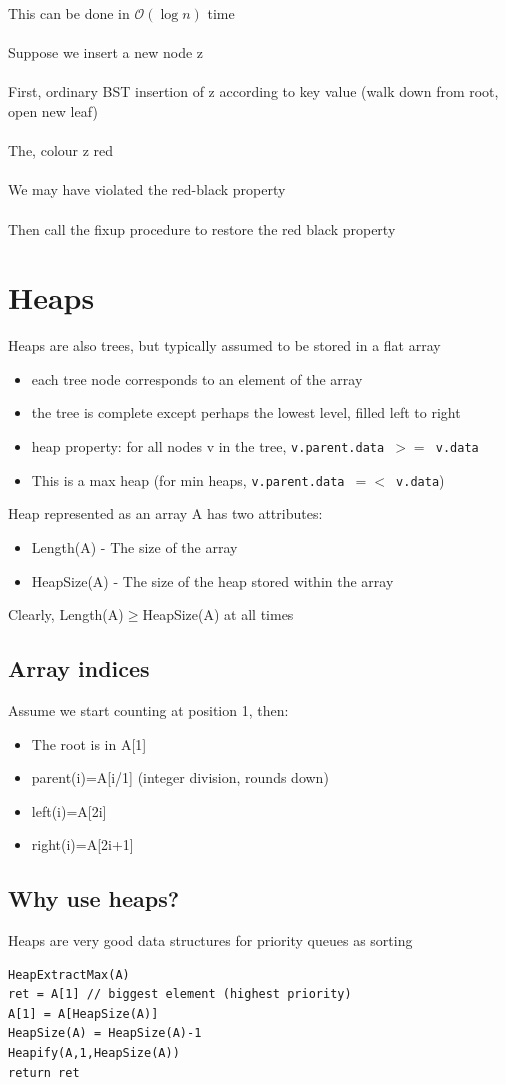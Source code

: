 \documentclass{article}[18pt]
\begin{document}
This can be done in $\mathcal{O}(\log n)$ time\\
\\
Suppose we insert a new node z\\
\\
First, ordinary BST insertion of z according to key value (walk down from root, open new leaf)\\
\\
The, colour z red\\
\\
We may have violated the red-black property\\
\\
Then call the fixup procedure to restore the red black property
\section{Heaps}
Heaps are also trees, but typically assumed to be stored in a flat array
\begin{itemize}
	\item each tree node corresponds to an element of the array
	\item the tree is complete except perhaps the lowest level, filled left to right
	\item heap property: for all nodes v in the tree, \texttt{v.parent.data $>=$ v.data}
	\item This is a max heap (for min heaps, \texttt{v.parent.data $=<$ v.data})
\end{itemize}
Heap represented as an array A has two attributes:
\begin{itemize}
	\item Length(A) - The size of the array
	\item HeapSize(A) - The size of the heap stored within the array
\end{itemize}
Clearly, Length(A)$\geqslant$HeapSize(A) at all times
\subsection{Array indices}
Assume we start counting at position 1, then:
\begin{itemize}
	\item The root is in A[1]
	\item parent(i)=A[i/1] (integer division, rounds down)
	\item left(i)=A[2i]
	\item right(i)=A[2i+1]
\end{itemize}
\subsection{Why use heaps?}
Heaps are very good data structures for priority queues as sorting
\begin{lstlisting}
HeapExtractMax(A)
ret = A[1] // biggest element (highest priority)
A[1] = A[HeapSize(A)]
HeapSize(A) = HeapSize(A)-1
Heapify(A,1,HeapSize(A))
return ret
\end{lstlisting}
\end{document}

